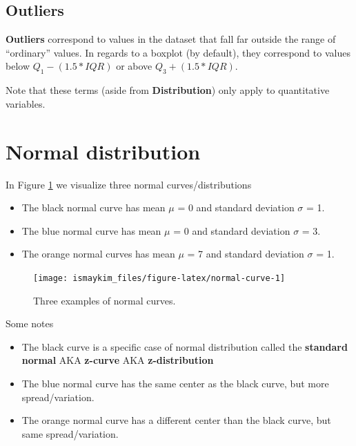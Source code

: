 \documentclass[12pt, krantz2,]{krantz}
\providecommand{\tightlist}{%
  \setlength{\itemsep}{0pt}\setlength{\parskip}{0pt}}
\begin{document}
\hypertarget{outliers}{%
\subsection{Outliers}\label{outliers}}

\textbf{Outliers} correspond to values in the dataset that fall far outside the range of ``ordinary'' values. In regards to a boxplot (by default), they correspond to values below \(Q_1 - (1.5 * IQR)\) or above \(Q_3 + (1.5 * IQR)\).

Note that these terms (aside from \textbf{Distribution}) only apply to quantitative variables.

\hypertarget{normal-curve}{%
\section{Normal distribution}\label{normal-curve}}

In Figure \ref{fig:normal-curve} we visualize three normal curves/distributions

\begin{itemize}
\tightlist
\item
  The black normal curve has mean \(\mu\) = 0 and standard deviation \(\sigma\) = 1.\\
\item
  The blue normal curve has mean \(\mu\) = 0 and standard deviation \(\sigma\) = 3.\\
\item
  The orange normal curves has mean \(\mu\) = 7 and standard deviation \(\sigma\) = 1.
\end{itemize}

\begin{figure}

{\centering \texttt{[image: ismaykim\_files/figure-latex/normal-curve-1]} 

}

\caption{Three examples of normal curves.}\label{fig:normal-curve}
\end{figure}

Some notes

\begin{itemize}
\tightlist
\item
  The black curve is a specific case of normal distribution called the \textbf{standard normal} AKA \textbf{z-curve} AKA \textbf{z-distribution}
\item
  The blue normal curve has the same center as the black curve, but more spread/variation.
\item
  The orange normal curve has a different center than the black curve, but same spread/variation.
\end{itemize}
\end{document}
